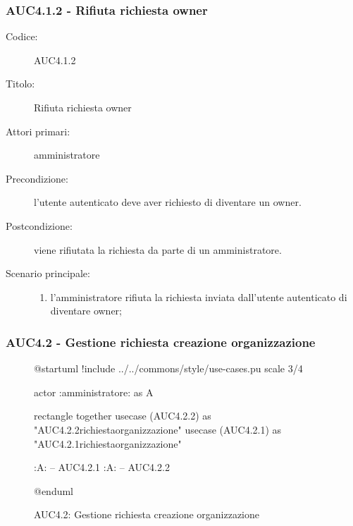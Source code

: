 \documentclass[casi-duso]{subfiles}
\begin{document}
\subsubsection{AUC4.1.2 - Rifiuta richiesta owner}%
\label{subsub:AUC4.1.2}
\begin{description}
  \item[Codice:] AUC4.1.2
  \item[Titolo:] Rifiuta richiesta owner
  \item[Attori primari:] amministratore
  \item[Precondizione:] l'utente autenticato deve aver richiesto di diventare un owner.
  \item[Postcondizione:] viene rifiutata la richiesta da parte di un amministratore.
  \item[Scenario principale:]
  \begin{enumerate}
    \item l'amministratore rifiuta la richiesta inviata dall'utente autenticato di diventare owner;
  \end{enumerate}
\end{description}

\subsubsection{AUC4.2 - Gestione richiesta creazione organizzazione}%
\label{subsub:AUC4.2}

\begin{figure}[h!]
  \centering
  \begin{plantuml}
  @startuml
  !include ../../commons/style/use-cases.pu
  scale 3/4

  actor :amministratore: as A

  rectangle {
    together {
      usecase (AUC4.2.2) as "AUC4.2.2\nRifiuta richiesta\ncreazione organizzazione"
      usecase (AUC4.2.1) as "AUC4.2.1\nAccetta richiesta\ncreazione organizzazione"
    }
  }

  :A: -- AUC4.2.1
  :A: -- AUC4.2.2

  @enduml
  \end{plantuml}
  \caption{AUC4.2: Gestione richiesta creazione organizzazione}
  \label{fig:auc4_2}
\end{figure}
\end{document}
